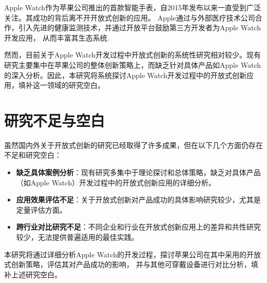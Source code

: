 Apple Watch作为苹果公司推出的首款智能手表，自2015年发布以来一直受到广泛关注。其成功的背后离不开开放式创新的应用。
Apple通过与外部医疗技术公司合作，引入先进的健康监测技术，并通过开放平台鼓励第三方开发者为Apple Watch开发应用，
从而丰富其生态系统\citep{apple2024}.

然而，目前关于Apple Watch开发过程中开放式创新的系统性研究相对较少。现有研究主要集中在苹果公司的整体创新策略上，而缺乏针对具体产品如Apple Watch的深入分析。因此，本研究将系统探讨Apple Watch开发过程中的开放式创新应用，填补这一领域的研究空白。

\section{研究不足与空白}

虽然国内外关于开放式创新的研究已经取得了许多成果，但在以下几个方面仍存在不足和研究空白：

\begin{itemize}
    \item \textbf{缺乏具体案例分析}：现有研究多集中于理论探讨和总体策略，缺乏对具体产品（如Apple Watch）开发过程中的开放式创新应用的详细分析。
    \item \textbf{应用效果评估不足}：关于开放式创新对产品成功的具体影响研究较少，尤其是定量评估方面。
    \item \textbf{跨行业对比研究不足}：不同企业和行业在开放式创新应用上的差异和共性研究较少，无法提供普遍适用的最佳实践。
\end{itemize}

本研究将通过详细分析Apple Watch的开发过程，探讨苹果公司在其中采用的开放式创新策略，评估其对产品成功的影响，
并与其他可穿戴设备进行对比分析，填补上述研究空白。
